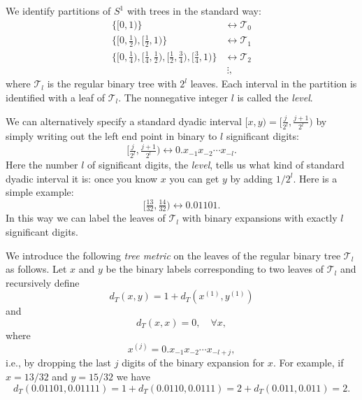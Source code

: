 \documentclass[11pt,oneside]{amsart}
\theoremstyle{plain}%
\theoremstyle{definition}
\theoremstyle{remark}
\begin{document}
We identify partitions of $S^1$ with trees in the standard way:
\begin{align}
	\{[0,1)\} &\leftrightarrow \mathcal{T}_0 \\
	\{[0,\tfrac12), [\tfrac12,1)\} &\leftrightarrow \mathcal{T}_1 \\
	\{[0,\tfrac14), [\tfrac14,\tfrac12), [\tfrac12,\tfrac34), [\tfrac34,1)\} &\leftrightarrow \mathcal{T}_2 \\
	&\ \vdots,
\end{align}
where $\mathcal{T}_l$ is the regular binary tree with $2^l$ leaves. Each interval in the partition is identified with a leaf of $\mathcal{T}_l$. The nonnegative integer $l$ is called the \emph{level}.

We can alternatively specify a standard dyadic interval $[x,y)= [\tfrac{j}{2^l}, \tfrac{j+1}{2^l})$ by simply writing out the left end point in binary to $l$ significant digits:
\begin{equation}
	[\tfrac{j}{2^l}, \tfrac{j+1}{2^l}) \leftrightarrow 0.x_{-1}x_{-2}\cdots x_{-l}.
\end{equation}
Here the number $l$ of significant digits, the \emph{level}, tells us what kind of standard dyadic interval it is: once you know $x$ you can get $y$ by adding $1/2^l$. Here is a simple example:
\begin{equation}
	[\tfrac{13}{32}, \tfrac{14}{32}) \leftrightarrow 0.01101.
\end{equation}
In this way we can label the leaves of $\mathcal{T}_l$ with binary expansions with exactly $l$ significant digits.

We introduce the following \emph{tree metric} on the leaves of the regular binary tree $\mathcal{T}_l$ as follows. Let $x$ and $y$ be the binary labels corresponding to two leaves of $\mathcal{T}_l$ and recursively define
\begin{equation}
	d_T(x,y) = 1+ d_T(x^{(1)},y^{(1)})
\end{equation}
and
\begin{equation}
	d_T(x,x) = 0, \quad \forall x,
\end{equation}
where
\begin{equation}
	x^{(j)} =  0.x_{-1}x_{-2}\cdots x_{-l+j},
\end{equation}
i.e., by dropping the last $j$ digits of the binary expansion for $x$.
For example, if $x = 13/32$ and $y = 15/32$ we have
\begin{equation}
	d_T(0.01101, 0.01111) = 1+ d_T(0.0110, 0.0111) = 2+d_T(0.011, 0.011) = 2.
\end{equation}
\end{document}
